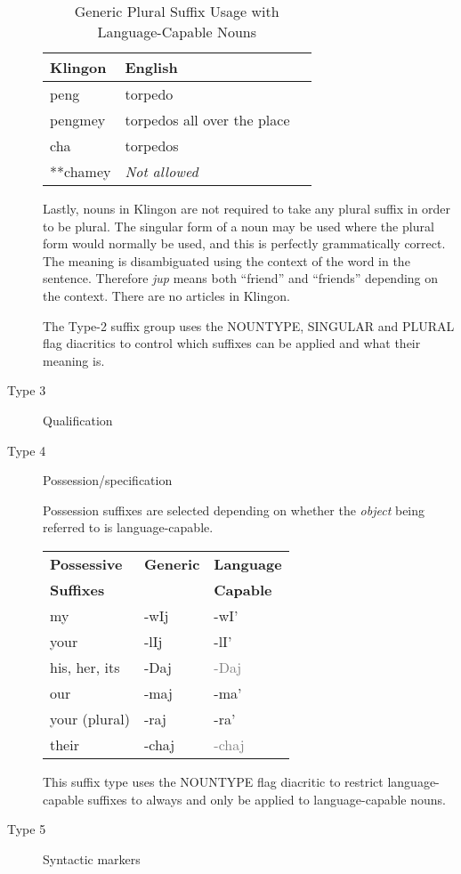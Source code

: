 \documentclass[11pt]{article}
\begin{document}
\begin{description}
	
	\begin{table}[h]
	\begin{center}
	\begin{tabular}{lll}
	\toprule
	\bf Klingon & \bf English \\
	\midrule
	peng & torpedo \\
	pengmey & torpedos all over the place \\
	cha & torpedos \\
	**chamey & \it Not allowed \\
	\bottomrule
	\end{tabular}
	\end{center}
	\caption{Generic Plural Suffix Usage with Language-Capable Nouns}
	\end{table}

	Lastly, nouns in Klingon are not required to take any plural suffix in order to be plural. The singular form of a noun may be used where the plural form would normally be used, and this is perfectly grammatically correct. The meaning is disambiguated using the context of the word in the sentence. Therefore \textit{jup} means both ``friend'' and ``friends'' depending on the context. There are no articles in Klingon.
	
	The Type-2 suffix group uses the NOUNTYPE, SINGULAR and PLURAL flag diacritics to control which suffixes can be applied and what their meaning is.

	\item[Type 3] Qualification
	\item[Type 4] Possession/specification
	
	Possession suffixes are selected depending on whether the \textit{object} being referred to is language-capable.

	\begin{center}
	\begin{tabular}{lll}
	\toprule
	\bf{Possessive} & \bf{Generic} & \bf{Language} \\
	\bf{Suffixes} & & \bf{Capable} \\
	\midrule
	my & -wIj & -wI' \\ \hline
	your & -lIj & -lI' \\ \hline
	his, her, its & -Daj & \textcolor{gray}{-Daj} \\ \hline
	our & -maj & -ma' \\ \hline
	your (plural) & -raj & -ra' \\ \hline
	their & -chaj & \textcolor{gray}{-chaj} \\
	\bottomrule
	\end{tabular}
	\end{center}
	
	This suffix type uses the NOUNTYPE flag diacritic to restrict language-capable suffixes to always and only be applied to language-capable nouns.

	\item[Type 5] Syntactic markers
\end{description}
\end{document}
